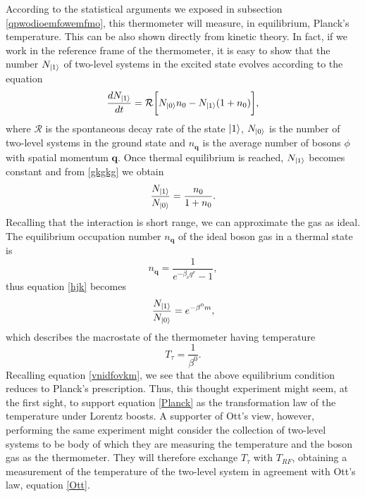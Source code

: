 \documentclass[twocolumn,usenatbib]{mnras2}
\newcommand{\vect}[1]{\mathbf{{#1}}}
\begin{document}
According to the statistical arguments we exposed in subsection \ref{qpwodioemfowemfmo}, this thermometer will measure, in equilibrium, Planck's temperature. This can be also shown directly from kinetic theory. In fact, if we work in the reference frame of the thermometer, it is easy to show that the number $N_{\ket{1}}$ of two-level systems in the excited state evolves according to the equation \citep{dirac1981principles}
\begin{equation}\label{gkgkg}
\dfrac{dN_{\ket{1}}}{dt} = \mathcal{R} \bigg[ N_{\ket{0}} n_0 - N_{\ket{1}} (1+n_0)  \bigg],
\end{equation} 
where $\mathcal{R}$ is the spontaneous decay rate of the state $\ket{1}$, $N_{\ket{0}}$ is the number of two-level systems in the ground state and $n_{\vect{q}}$ is the average number of bosons $\phi$ with spatial momentum $\vect{q}$. Once thermal equilibrium is reached, $N_{\ket{1}}$ becomes constant and from \eqref{gkgkg} we obtain
\begin{equation}\label{hjk}
\dfrac{N_{\ket{1}}}{N_{\ket{0}}} = \dfrac{n_0}{1+n_0}.
\end{equation}
Recalling that the interaction is short range, we can approximate the gas as ideal. The equilibrium occupation number $n_{\vect{q}}$ of the ideal boson gas in a thermal state is 
\begin{equation}
n_\vect{q} = \dfrac{1}{e^{-\beta_\nu q^\nu}-1},
\end{equation} 
thus equation \eqref{hjk} becomes
\begin{equation}
\dfrac{N_{\ket{1}}}{N_{\ket{0}}} = e^{-\beta^0 m},
\end{equation} 
which describes the macrostate of the thermometer having temperature
\begin{equation}
T_\tau = \dfrac{1}{\beta^0} .
\end{equation}
Recalling equation \eqref{vnidfovkm}, we see that the above equilibrium condition reduces to Planck's prescription. Thus, this thought experiment might seem, at the first sight, to support equation \eqref{Planck} as the transformation law of the temperature under Lorentz boosts. A supporter of Ott's view, however, performing the same experiment might consider the collection of two-level systems to be body of which they are measuring the temperature and the boson gas as the thermometer. They will therefore exchange $T_\tau$ with $T_{RF}$, obtaining a measurement of the temperature of the two-level system in agreement with Ott's law, equation \eqref{Ott}.
\end{document}
